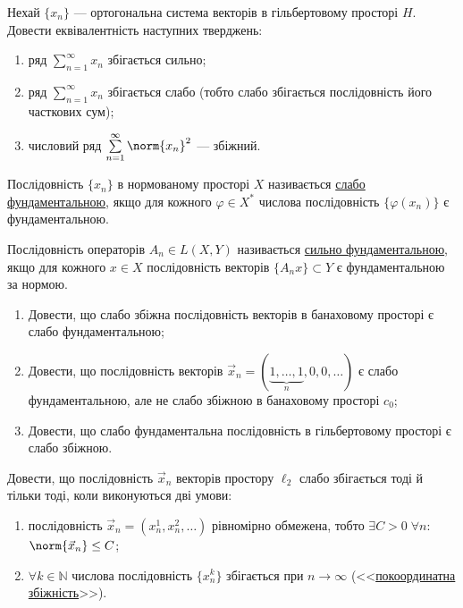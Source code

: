 
\begin{exercise}
    Нехай $\{x_n\}$ --- ортогональна система векторів в гільбертовому просторі $H$.
    Довести еквівалентність наступних тверджень:
    \begin{enumerate}
        \item ряд $\sum\limits^\infty_{n=1} x_n$ збігається сильно;
        \item ряд $\sum\limits^\infty_{n=1} x_n$ збігається слабо (тобто слабо збігається
        послідовність його часткових сум);
        \item числовий ряд $\sum\limits^\infty_{n=1} \norm{x_n}^2$ --- збіжний.
    \end{enumerate}
\end{exercise}

\begin{theory}
    Послідовність $\{x_n\}$ в нормованому просторі $X$ називається \ul{слабо фундаментальною},
    якщо для кожного $\varphi \in X^*$ числова послідовність $\{\varphi(x_n)\}$ є фундаментальною.
    
    Послідовність операторів $A_n \in L(X,Y)$ називається \ul{сильно фундаментальною},
    якщо для кожного $x \in X$ послідовність векторів $\{A_n x\} \subset Y$ є фундаментальною
    за нормою.
\end{theory}

\begin{exercise}
    \begin{enumerate}
        \item Довести, що слабо збіжна послідовність векторів в банаховому просторі 
        є слабо фундаментальною;
        \item Довести, що послідовність векторів $\vec{x}_n = 
        (\underbrace{1,\dots,1}_{n},0,0,\dots)$ є слабо фундаментальною, але не слабо 
        збіжною в банаховому просторі $c_0$;
        \item Довести, що слабо фундаментальна послідовність в гільбертовому просторі 
        є слабо збіжною.
    \end{enumerate}
\end{exercise}

\begin{exercise}
    Довести, що послідовність $\vec{x}_n$ векторів простору $\ell_2$ слабо збігається тоді
    й тільки тоді, коли виконуються дві умови:
    \begin{enumerate}
        \item послідовність $\vec{x}_n = (x_n^1,x_n^2,\dots)$ рівномірно обмежена, тобто
        $\exists C > 0 \; \forall n$: $\norm{\vec{x}_n} \leq C$;
        \item $\forall k \in \mathbb{N}$ числова послідовність $\{x_n^k\}$ збігається при
        $n \to \infty$ (<<\ul{покоординатна збіжність}>>).
    \end{enumerate}
\end{exercise}

